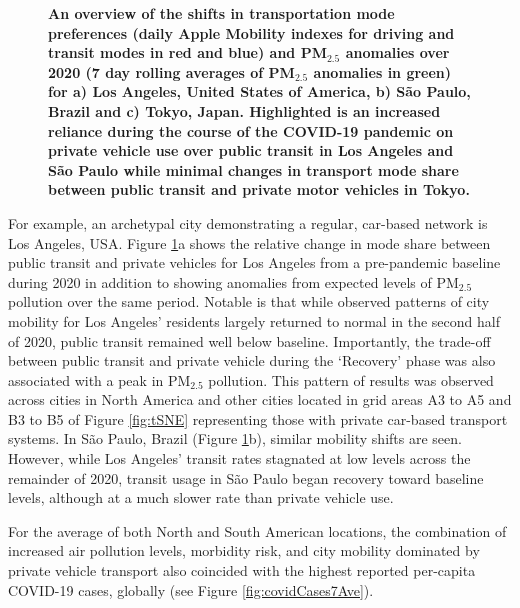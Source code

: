 \documentclass[preprint,10pt]{elsarticle} %
\begin{document}
\begin{figure}
         \label{fig:Tokyo}
        \caption{\bf An overview of the shifts in transportation mode preferences (daily Apple Mobility indexes for driving and transit modes in red and blue) and PM$_{2.5}$ anomalies over 2020 (7 day rolling averages of PM$_{2.5}$ anomalies in green) for a) Los Angeles, United States of America, b) S\~ao Paulo, Brazil and c) Tokyo, Japan. Highlighted is an increased reliance during the course of the COVID-19 pandemic on private vehicle use over public transit in Los Angeles and S\~ao Paulo while minimal changes in transport mode share between public transit and private motor vehicles in Tokyo.}
        \label{fig:three_graphs_Driv_trans}
\end{figure}

For example, an archetypal city demonstrating a regular, car-based network is Los Angeles, USA. Figure \ref{fig:three_graphs_Driv_trans}a shows the relative change in mode share between public transit and private vehicles for Los Angeles from a pre-pandemic baseline during 2020 in addition to showing anomalies from expected levels of PM$_{2.5}$ pollution over the same period. Notable is that while observed patterns of city mobility for Los Angeles' residents largely returned to normal in the second half of 2020, public transit remained well below baseline. Importantly, the trade-off between public transit and private vehicle during the `Recovery' phase was also associated with a peak in PM$_{2.5}$ pollution. This pattern of results was observed across cities in North America and other cities located in grid areas A3 to A5 and B3 to B5 of Figure \ref{fig:tSNE} representing those with private car-based transport systems. In S\~ao Paulo, Brazil (Figure \ref{fig:three_graphs_Driv_trans}b), similar mobility shifts are seen. However, while Los Angeles' transit rates stagnated at low levels across the remainder of 2020, transit usage in S\~ao Paulo began recovery toward baseline levels, although at a much slower rate than private vehicle use.

For the average of both North and South American locations, the combination of increased air pollution levels, morbidity risk, and city mobility dominated by private vehicle transport also coincided with the highest reported per-capita COVID-19 cases, globally (see Figure \ref{fig:covidCases7Ave}). 
\end{document}
